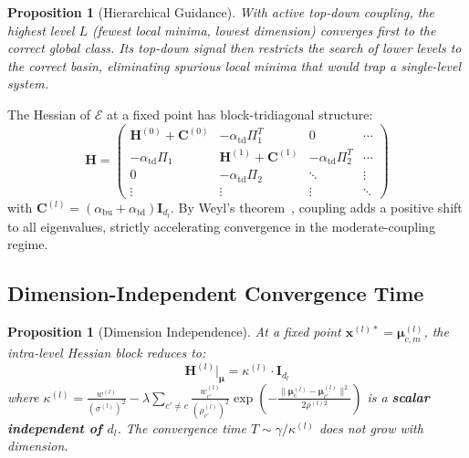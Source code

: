 \documentclass[11pt,a4paper]{article}
\newtheorem{proposition}[theorem]{Proposition}
\begin{document}
\begin{proposition}[Hierarchical Guidance]
With active top-down coupling, the highest level $L$ (fewest local minima, lowest dimension)
converges first to the correct global class.  Its top-down signal then restricts the search of
lower levels to the correct basin, eliminating spurious local minima that would trap a
single-level system.
\label{prop:guidance}
\end{proposition}

The Hessian of $\mathcal{E}$ at a fixed point has block-tridiagonal structure:
\begin{equation}
  \mathbf{H} = \begin{pmatrix}
    \mathbf{H}^{(0)} + \mathbf{C}^{(0)} & -\alpha_{\mathrm{td}}\Pi_1^T & 0 & \cdots \\
    -\alpha_{\mathrm{td}}\Pi_1 & \mathbf{H}^{(1)} + \mathbf{C}^{(1)} & -\alpha_{\mathrm{td}}\Pi_2^T & \cdots \\
    0 & -\alpha_{\mathrm{td}}\Pi_2 & \ddots & \vdots \\
    \vdots & \vdots & \vdots & \ddots
  \end{pmatrix}
\end{equation}
with $\mathbf{C}^{(l)} = (\alpha_{\mathrm{bu}} + \alpha_{\mathrm{td}})\mathbf{I}_{d_l}$.  By
Weyl's theorem~\cite{weyl1912}, coupling adds a positive shift to all eigenvalues, strictly
accelerating convergence in the moderate-coupling regime.

\subsection{Dimension-Independent Convergence Time}
\label{sec:theory:dimindep}

\begin{proposition}[Dimension Independence]
At a fixed point $\mathbf{x}^{(l)*} = \boldsymbol{\mu}^{(l)}_{c,m}$, the intra-level Hessian
block reduces to:
\begin{equation}
  \mathbf{H}^{(l)}\big|_{\boldsymbol{\mu}} = \kappa^{(l)} \cdot \mathbf{I}_{d_l}
\end{equation}
where
$\kappa^{(l)} = \frac{w^{(l)}}{(\sigma^{(l)})^2}
  - \lambda \sum_{c' \ne c} \frac{w^{(l)}_{c'}}{(\rho^{(l)}_{c'})^2}
    \exp\!\left(-\frac{\|\boldsymbol{\mu}^{(l)}_c - \boldsymbol{\mu}^{(l)}_{c'}\|^2}{2\rho^{(l)2}}\right)$
is a \textbf{scalar independent of $d_l$}.  The convergence time $T \sim \gamma/\kappa^{(l)}$
does not grow with dimension.
\label{prop:dimindep}
\end{proposition}
\end{document}
